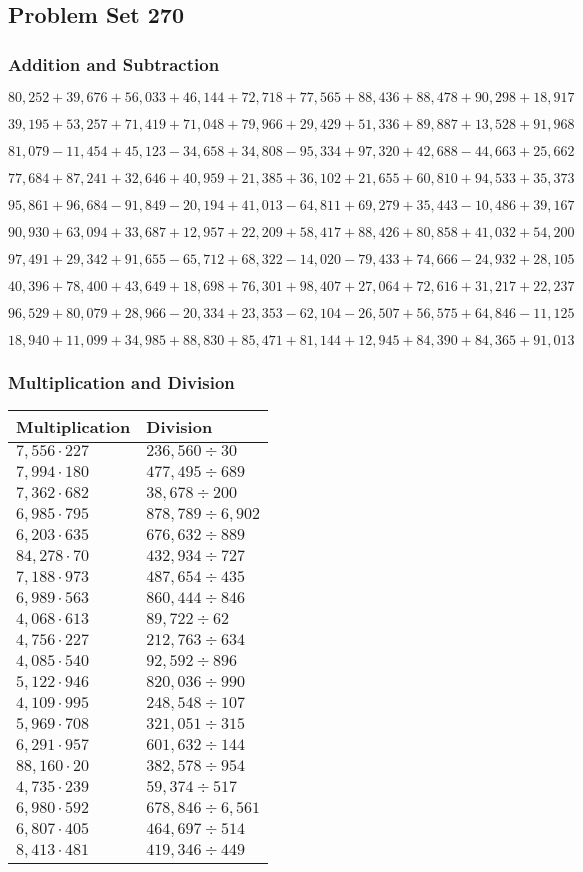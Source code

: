 \hypertarget{problem-set-270}{%
\subsection{Problem Set 270}\label{problem-set-270}}

\hypertarget{addition-and-subtraction}{%
\subsubsection{Addition and
Subtraction}\label{addition-and-subtraction}}

\(80,252+39,676+56,033+46,144+72,718+77,565+88,436+88,478+90,298+18,917\)

\(39,195+53,257+71,419+71,048+79,966+29,429+51,336+89,887+13,528+91,968\)

\(81,079-11,454+45,123-34,658+34,808-95,334+97,320+42,688-44,663+25,662\)

\(77,684+87,241+32,646+40,959+21,385+36,102+21,655+60,810+94,533+35,373\)

\(95,861+96,684-91,849-20,194+41,013-64,811+69,279+35,443-10,486+39,167\)

\(90,930+63,094+33,687+12,957+22,209+58,417+88,426+80,858+41,032+54,200\)

\(97,491+29,342+91,655-65,712+68,322-14,020-79,433+74,666-24,932+28,105\)

\(40,396+78,400+43,649+18,698+76,301+98,407+27,064+72,616+31,217+22,237\)

\(96,529+80,079+28,966-20,334+23,353-62,104-26,507+56,575+64,846-11,125\)

\(18,940+11,099+34,985+88,830+85,471+81,144+12,945+84,390+84,365+91,013\)

\hypertarget{multiplication-and-division}{%
\subsubsection{Multiplication and
Division}\label{multiplication-and-division}}

\begin{longtable}[]{@{}ll@{}}
\toprule
Multiplication & Division\tabularnewline
\midrule
\endhead
\(7,556\cdot227\) & \(236,560 ÷30\)\tabularnewline
\(7,994\cdot180\) & \(477,495÷689\)\tabularnewline
\(7,362\cdot682\) & \(38,678÷200\)\tabularnewline
\(6,985\cdot795\) & \(878,789÷6,902\)\tabularnewline
\(6,203\cdot635\) & \(676,632÷889\)\tabularnewline
\(84,278\cdot70\) & \(432,934÷727\)\tabularnewline
\(7,188\cdot973\) & \(487,654÷435\)\tabularnewline
\(6,989\cdot563\) & \(860,444÷846\)\tabularnewline
\(4,068\cdot613\) & \(89,722÷62\)\tabularnewline
\(4,756\cdot227\) & \(212,763÷634\)\tabularnewline
\(4,085\cdot540\) & \(92,592÷896\)\tabularnewline
\(5,122\cdot946\) & \(820,036÷990\)\tabularnewline
\(4,109\cdot995\) & \(248,548÷107\)\tabularnewline
\(5,969\cdot708\) & \(321,051÷315\)\tabularnewline
\(6,291\cdot957\) & \(601,632÷144\)\tabularnewline
\(88,160\cdot20\) & \(382,578÷954\)\tabularnewline
\(4,735\cdot239\) & \(59,374÷517\)\tabularnewline
\(6,980\cdot592\) & \(678,846÷6,561\)\tabularnewline
\(6,807\cdot405\) & \(464,697÷514\)\tabularnewline
\(8,413\cdot481\) & \(419,346÷449\)\tabularnewline
\bottomrule
\end{longtable}
